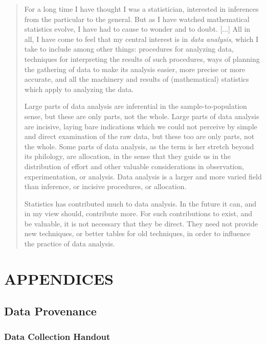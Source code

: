 \documentclass[]{article}
\begin{document}
\begin{quote}
For a long time I have thought I was a statistician, interested in inferences from the particular to the general.  But as I have watched mathematical statistics evolve, I have had to cause to wonder and to doubt. [...] All in all, I have come to feel that my central interest is in \emph{data analysis}, which I take to include among other things: procedures for analyzing data, techniques for interpreting the results of such procedures, ways of planning the gathering of data to make its analysis easier, more precise or more accurate, and all the machinery and results of (mathematical) statistics which apply to analyzing the data.

Large parts of data analysis are inferential in the sample-to-population sense, but these are only parts, not the whole.  Large parts of data analysis are incisive, laying bare indications which we could not perceive by simple and direct examination of the raw data, but these too are only parts, not the whole.  Some parts of data analysis, as the term is her stretch beyond its philology, are allocation, in the sense that they guide us in the distribution of effort and other valuable considerations in observation, experimentation, or analysis.  Data analysis is a larger and more varied field than inference, or incisive procedures, or allocation.

Statistics has contributed much to data analysis.  In the future it can, and in my view should, contribute more.  For such contributions to exist, and be valuable, it is not necessary that they be direct.  They need not provide new techniques, or better tables for old techniques, in order to influence the practice of data analysis.
\end{quote}

\newpage
\section{APPENDICES}
\label{sec:appendix}

\subsection{Data Provenance}
\label{sec:appendix-data-provenance}

\newpage
\subsubsection{Data Collection Handout}
\label{sec:appendix-data-handout}
\end{document}
